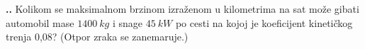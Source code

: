 
\noindent 
\textbf{
\thecjelina.\thezadatak.}
Kolikom se maksimalnom brzinom izraženom u kilometrima na sat može gibati automobil
mase $1400\ kg$ i snage $45\ kW$ po cesti na kojoj je koeficijent kinetičkog trenja 0,08? (Otpor
zraka se zanemaruje.)
